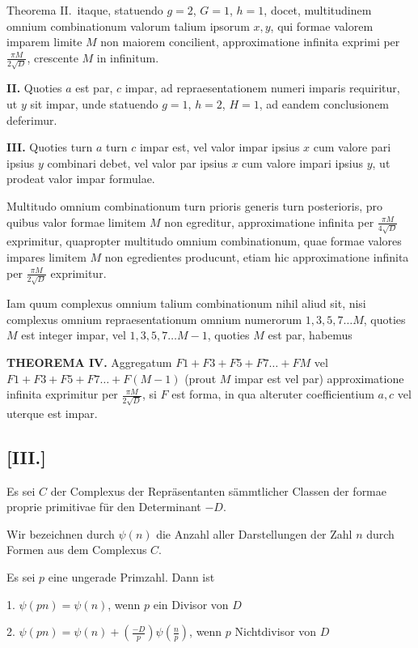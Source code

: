 \documentclass[12pt,a4paper]{article}
\begin{document}
Theorema II.\ itaque, statuendo $g=2$, $G=1$, $h=1$, docet, multitudinem omnium combinationum valorum talium ipsorum $x, y$, qui formae valorem imparem limite $M$ non maiorem concilient, approximatione infinita exprimi per $\frac{\pi M}{2\sqrt{D}}$, crescente $M$ in infinitum.

\textbf{II.} Quoties $a$ est par, $c$ impar, ad repraesentationem numeri imparis requiritur, ut $y$ sit impar, unde statuendo $g=1$, $h=2$, $H=1$, ad eandem conclusionem deferimur.

\textbf{III.} Quoties turn $a$ turn $c$ impar est, vel valor impar ipsius $x$ cum valore pari ipsius $y$ combinari debet, vel valor par ipsius $x$ cum valore impari ipsius $y$, ut prodeat valor impar formulae.

Multitudo omnium combinationum turn prioris generis turn posterioris, pro quibus valor formae limitem $M$ non egreditur, approximatione infinita per $\frac{\pi M}{4\sqrt{D}}$ exprimitur, quapropter multitudo omnium combinationum, quae formae valores impares limitem $M$ non egredientes producunt, etiam hic approximatione infinita per $\frac{\pi M}{2\sqrt{D}}$ exprimitur.

Iam quum complexus omnium talium combinationum nihil aliud sit, nisi complexus omnium repraesentationum omnium numerorum $1, 3, 5, 7\ldots M$, quoties $M$ est integer impar, vel $1, 3, 5, 7\ldots M-1$, quoties $M$ est par, habemus

\textbf{THEOREMA IV.} Aggregatum $F1+F3+F5+F7\ldots+FM$ vel $F1+F3+F5+F7\ldots+F(M-1)$ (prout $M$ impar est vel par) approximatione infinita exprimitur per $\frac{\pi M}{2\sqrt{D}}$, si $F$ est forma, in qua alteruter coefficientium $a, c$ vel uterque est impar.

\subsection*{[III.]}

Es sei $C$ der Complexus der Repr\"asentanten s\"ammtlicher Classen der formae proprie primitivae f\"ur den Determinant $-D$.

Wir bezeichnen durch $\psi(n)$ die Anzahl aller Darstellungen der Zahl $n$ durch Formen aus dem Complexus $C$.

Es sei $p$ eine ungerade Primzahl. Dann ist

1. $\psi(pn) = \psi(n)$, wenn $p$ ein Divisor von $D$

2. $\psi(pn) = \psi(n) + \left(\frac{-D}{p}\right)\psi\left(\frac{n}{p}\right)$, wenn $p$ Nichtdivisor von $D$
\end{document}

